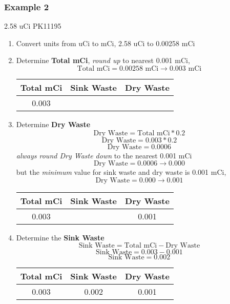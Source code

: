 \documentclass[12pt, letterpaper]{article}
\begin{document}
\FloatBarrier

\subsubsection{Example 2}
2.58 uCi PK11195
\begin{enumerate}
    \item Convert units from uCi to mCi, 2.58 uCi to 0.00258 mCi
    \item Determine \textbf{Total mCi}, \emph{round up} to nearest 0.001 mCi,
    \[ \text{Total mCi} = 0.00258 \text{ mCi}  \rightarrow 0.003 \text{ mCi} \]
    \begin{table}[ht]
        \centering
        \begin{tabular}{|c|c|c|}
            \hline
            \textbf{Total mCi} & \textbf{Sink Waste} & \textbf{Dry Waste} \\
            \hline
            0.003 &  &  \\
            \hline
        \end{tabular}
    \end{table}
    \item Determine \textbf{Dry Waste}
    \[ \text{Dry Waste} = \text{Total mCi} * 0.2 \]
    \[ \text{Dry Waste} = 0.003 * 0.2 \]
    \[ \text{Dry Waste} = 0.0006 \]
    \emph{always round Dry Waste down} to the nearest 0.001 mCi
    \[ \text{Dry Waste} = 0.0006 \rightarrow 0.000 \]
    but the \emph{minimum} value for sink waste and dry waste is 0.001 mCi,
    \[ \text{Dry Waste} = 0.000 \rightarrow 0.001 \]
    \begin{table}[ht]
        \centering
        \begin{tabular}{|c|c|c|}
            \hline
            \textbf{Total mCi} & \textbf{Sink Waste} & \textbf{Dry Waste} \\
            \hline
            0.003 & & 0.001 \\
            \hline
        \end{tabular}
    \end{table}
    \item Determine the \textbf{Sink Waste}
    \[ \text{Sink Waste} = \text{Total mCi} - \text{Dry Waste} \]
    \[ \text{Sink Waste} = 0.003 - 0.001 \]
    \[ \text{Sink Waste} = 0.002 \]
    \begin{table}[ht]
        \centering
        \begin{tabular}{|c|c|c|}
            \hline
            \textbf{Total mCi} & \textbf{Sink Waste} & \textbf{Dry Waste} \\
            \hline
            0.003 & 0.002 & 0.001 \\
            \hline
        \end{tabular}
    \end{table}
\end{enumerate}
\end{document}
